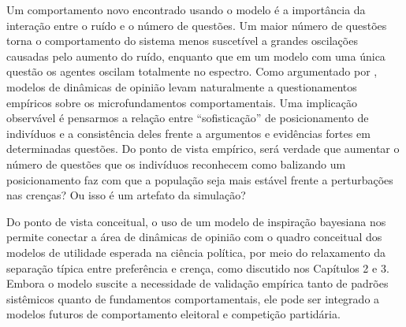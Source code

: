     Um comportamento novo encontrado usando o modelo é a importância da
    interação entre o ruído e o número de questões. Um maior número de questões
    torna o comportamento do sistema menos suscetível a grandes oscilações
    causadas pelo aumento do ruído, enquanto que em um modelo com uma única
    questão os agentes oscilam totalmente no espectro. Como argumentado por
    , modelos de dinâmicas de opinião levam naturalmente
    a questionamentos empíricos sobre os microfundamentos comportamentais. Uma
    implicação observável é pensarmos a relação entre ``sofisticação'' de
    posicionamento de indivíduos e a consistência deles frente a argumentos e
    evidências fortes em determinadas questões. Do ponto de vista empírico, será
    verdade que aumentar o número de questões que os indivíduos reconhecem como
    balizando um posicionamento faz com que a população seja mais estável frente
    a perturbações nas crenças? Ou isso é um artefato da simulação?

    Do ponto de vista conceitual, o uso de um modelo de inspiração bayesiana nos
    permite conectar a área de dinâmicas de opinião com o quadro conceitual dos
    modelos de utilidade esperada na ciência política, por meio do relaxamento
    da separação típica entre preferência e crença, como discutido nos Capítulos
    2 e 3. Embora o modelo suscite a necessidade de validação empírica tanto de
    padrões sistêmicos quanto de fundamentos comportamentais, ele pode ser
    integrado a modelos futuros de comportamento eleitoral e competição
    partidária.


    
